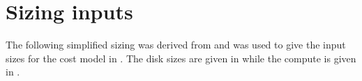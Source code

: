 \section{Sizing inputs}

The following simplified sizing was derived from  and was used to give the input sizes
for the cost model in .
The disk sizes are given in  while the compute is given in .






